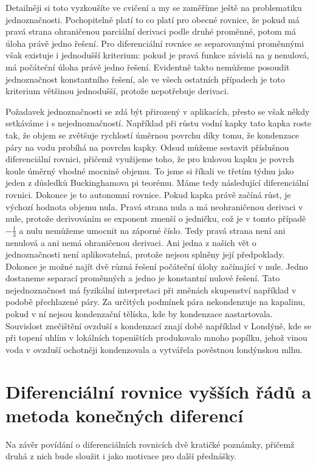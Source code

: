 \documentclass[12pt]{article}
\begin{document}
Detailněji si toto vyzkoušíte ve cvičení a my se zaměříme ještě na problematiku jednoznačnosti. Pochopitelně platí to co platí pro obecné rovnice, že pokud má pravá strana ohraničenou parciální derivaci podle druhé proměnné, potom má úloha právě jedno řešení. Pro diferenciální rovnice se separovanými proměnnými však existuje i jednodušší kriterium: pokud je pravá funkce závislá na $y$ nenulová, má počáteční úloha právě jedno řešení. Evidentně takto nemůžeme posoudit jednoznačnost konstantního řešení, ale ve všech ostatních případech je toto kriterium většinou jednodušší, protože nepotřebuje derivaci.

Požadavek jednoznačnosti se zdá být přirozený v aplikacích, přesto se však někdy setkáváme i s nejednoznačností. Například při růstu vodní kapky tato kapka roste tak, že objem se zvětšuje rychlostí úměrnou povrchu díky tomu, že kondenzace páry na vodu probíhá na povrchu kapky. Odsud můžeme sestavit příslušnou diferenciální rovnici, přičemž využijeme toho, že pro kulovou kapku je povrch koule úměrný vhodné mocnině objemu. To jsme si říkali ve třetím týdnu jako jeden z důsledků Buckinghamova pi teorému. Máme tedy následující diferenciální rovnici. Dokonce je to autonomní rovnice. Pokud kapka právě začíná růst, je výchozí hodnota objemu nula. Pravá strana nula a má neohraničenou derivaci v nule, protože derivováním se exponent zmenší o jedničku, což je v tomto případě $-\frac 13$ a nulu nemůžeme umocnit na záporné číslo. Tedy pravá strana není ani nenulová a ani nemá ohraničenou derivaci. Ani jedna z našich vět o jednoznačnosti není aplikovatelná, protože nejsou splněny její předpoklady. Dokonce je možné najít dvě různá řešení počáteční úlohy začínající v nule. Jedno dostaneme separací proměnných a jedno je konstantní nulové řešení. Tato nejednoznačnost má fyzikální interpretaci při změnách skupenství například v podobě přechlazené páry. Za určitých podmínek pára nekondenzuje na kapalinu, pokud v ní nejsou kondenzační tělíska, kde by kondenzace nastartovala. Souvislost znečištění ovzduší s kondenzací znají době například v Londýně, kde se při topení uhlím v lokálních topeništích produkovalo mnoho popílku, jehož vinou voda v ovzduší ochotněji kondenzovala a vytvářela pověstnou londýnskou mlhu.


\section*{Diferenciální rovnice vyšších řádů a metoda konečných diferencí}

Na závěr povídání o diferenciálních rovnicích dvě kratičké poznámky, přičemž druhá z nich bude sloužit i jako motivace pro další přednášky.
\end{document}
